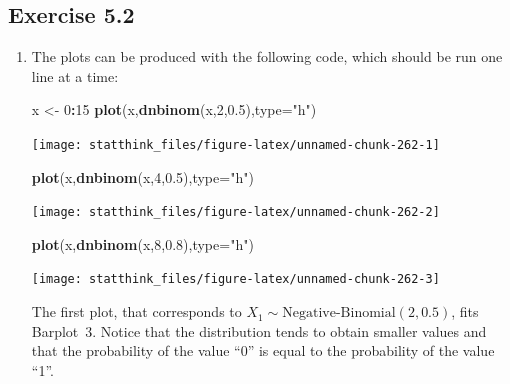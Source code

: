 \documentclass[
]{krantz}
\makeatletter
\newenvironment{Shaded}{\begin{snugshade}}{\end{snugshade}}
\newcommand{\DataTypeTok}[1]{\textcolor[rgb]{0.13,0.29,0.53}{#1}}
\newcommand{\DecValTok}[1]{\textcolor[rgb]{0.00,0.00,0.81}{#1}}
\newcommand{\FloatTok}[1]{\textcolor[rgb]{0.00,0.00,0.81}{#1}}
\newcommand{\KeywordTok}[1]{\textcolor[rgb]{0.13,0.29,0.53}{\textbf{#1}}}
\newcommand{\NormalTok}[1]{#1}
\newcommand{\OperatorTok}[1]{\textcolor[rgb]{0.81,0.36,0.00}{\textbf{#1}}}
\newcommand{\StringTok}[1]{\textcolor[rgb]{0.31,0.60,0.02}{#1}}
\newenvironment{kframe}{%
\medskip{}
\setlength{\fboxsep}{.8em}
 \def\at@end@of@kframe{}%
 \ifinner\ifhmode%
  \def\at@end@of@kframe{\end{minipage}}%
  \begin{minipage}{\columnwidth}%
 \fi\fi%
 \def\FrameCommand##1{\hskip\@totalleftmargin \hskip-\fboxsep
 \colorbox{shadecolor}{##1}\hskip-\fboxsep
     \hskip-\linewidth \hskip-\@totalleftmargin \hskip\columnwidth}%
 \MakeFramed {\advance\hsize-\width
   \@totalleftmargin\z@ \linewidth\hsize
   \@setminipage}}%
 {\par\unskip\endMakeFramed%
 \at@end@of@kframe}
\renewenvironment{Shaded}{\begin{kframe}}{\end{kframe}}
\theoremstyle{definition}
\theoremstyle{definition}
\theoremstyle{definition}
\theoremstyle{remark}
\makeatother
\begin{document}
\hypertarget{exercise-5.2}{%
\subsection*{Exercise 5.2}\label{exercise-5.2}}


\begin{enumerate}
\def\labelenumi{\arabic{enumi}.}
\item
  The plots can be produced with the
  following code, which should be run one line at a time:

\begin{Shaded}
\begin{Highlighting}[]
\NormalTok{x <-}\StringTok{ }\DecValTok{0}\OperatorTok{:}\DecValTok{15}
\KeywordTok{plot}\NormalTok{(x,}\KeywordTok{dnbinom}\NormalTok{(x,}\DecValTok{2}\NormalTok{,}\FloatTok{0.5}\NormalTok{),}\DataTypeTok{type=}\StringTok{"h"}\NormalTok{)}
\end{Highlighting}
\end{Shaded}

  \begin{center}\texttt{[image: statthink\_files/figure-latex/unnamed-chunk-262-1]} \end{center}

\begin{Shaded}
\begin{Highlighting}[]
\KeywordTok{plot}\NormalTok{(x,}\KeywordTok{dnbinom}\NormalTok{(x,}\DecValTok{4}\NormalTok{,}\FloatTok{0.5}\NormalTok{),}\DataTypeTok{type=}\StringTok{"h"}\NormalTok{)}
\end{Highlighting}
\end{Shaded}

  \begin{center}\texttt{[image: statthink\_files/figure-latex/unnamed-chunk-262-2]} \end{center}

\begin{Shaded}
\begin{Highlighting}[]
\KeywordTok{plot}\NormalTok{(x,}\KeywordTok{dnbinom}\NormalTok{(x,}\DecValTok{8}\NormalTok{,}\FloatTok{0.8}\NormalTok{),}\DataTypeTok{type=}\StringTok{"h"}\NormalTok{)}
\end{Highlighting}
\end{Shaded}

  \begin{center}\texttt{[image: statthink\_files/figure-latex/unnamed-chunk-262-3]} \end{center}

  The first plot, that corresponds to
  \(X_1 \sim \mbox{Negative-Binomial}(2,0.5)\), fits Barplot~3. Notice that
  the distribution tends to obtain smaller values and that the probability
  of the value ``0'' is equal to the probability of the value ``1''.


\end{enumerate}
\end{document}
